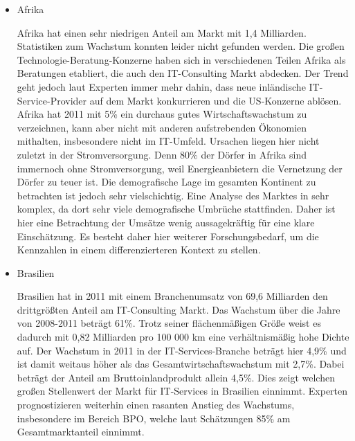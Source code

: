 \begin{itemize}
\item {Afrika}

Afrika hat einen sehr niedrigen Anteil am Markt mit 1,4 Milliarden. \cite{statAfr} Statistiken zum Wachstum konnten leider nicht gefunden werden. Die großen Technologie-Beratung-Konzerne haben sich in verschiedenen Teilen Afrika als Beratungen etabliert, die auch den IT-Consulting Markt abdecken. Der Trend geht jedoch laut Experten immer mehr dahin, dass neue inländische IT-Service-Provider auf dem Markt konkurrieren und die US-Konzerne ablösen. Afrika hat 2011 mit 5\% ein durchaus gutes Wirtschaftswachstum zu verzeichnen, kann aber nicht mit anderen aufstrebenden Ökonomien mithalten, insbesondere nicht im IT-Umfeld. \cite{statAfr2}
Ursachen liegen hier nicht zuletzt in der Stromversorgung. Denn 80\% der Dörfer in Afrika sind immernoch ohne Stromversorgung, weil Energieanbietern die Vernetzung der Dörfer zu teuer ist.  \cite{dieZeit}
Die demografische Lage im gesamten Kontinent zu betrachten ist jedoch sehr vielschichtig. Eine Analyse des Marktes in sehr komplex, da dort sehr viele demografische Umbrüche stattfinden. Daher ist hier eine Betrachtung der Umsätze wenig aussagekräftig für eine klare Einschätzung. Es besteht daher hier weiterer Forschungsbedarf, um die Kennzahlen in einem differenzierteren  Kontext zu stellen.


\item {Brasilien}

Brasilien hat in 2011 mit einem Branchenumsatz von 69,6 Milliarden den drittgrößten Anteil am IT-Consulting Markt. Das Wachstum über die Jahre von 2008-2011 beträgt 61\%. \cite{statBras2} Trotz seiner flächenmäßigen Größe weist es dadurch mit 0,82 Milliarden pro 100 000 km eine verhältnismäßig hohe Dichte auf. Der Wachstum in 2011 in der IT-Services-Branche beträgt hier 4,9\% und ist damit weitaus höher als das Gesamtwirtschaftswachstum mit 2,7\%. Dabei beträgt der Anteil am Bruttoinlandprodukt allein 4,5\%. Dies zeigt welchen großen Stellenwert der Markt für IT-Services in Brasilien einnimmt. Experten prognostizieren weiterhin einen rasanten Anstieg des Wachstums, insbesondere im Bereich BPO, welche laut Schätzungen 85\% am Gesamtmarktanteil einnimmt.\cite{statBras}


\end{itemize}



